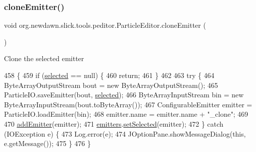 \subsubsection{\texorpdfstring{clone\+Emitter()}{cloneEmitter()}}
{\footnotesize\ttfamily void org.\+newdawn.\+slick.\+tools.\+peditor.\+Particle\+Editor.\+clone\+Emitter (\begin{DoxyParamCaption}{ }\end{DoxyParamCaption})\hspace{0.3cm}{\ttfamily [inline]}}

Clone the selected emitter 
\begin{DoxyCode}
458                                \{
459         \textcolor{keywordflow}{if} (\mbox{\hyperlink{classorg_1_1newdawn_1_1slick_1_1tools_1_1peditor_1_1_particle_editor_ac63e919aceff5c0b0c3b9a307b5f079a}{selected}} == null) \{
460             \textcolor{keywordflow}{return};
461         \}
462         
463         \textcolor{keywordflow}{try} \{
464             ByteArrayOutputStream bout = \textcolor{keyword}{new} ByteArrayOutputStream();
465             ParticleIO.saveEmitter(bout, \mbox{\hyperlink{classorg_1_1newdawn_1_1slick_1_1tools_1_1peditor_1_1_particle_editor_ac63e919aceff5c0b0c3b9a307b5f079a}{selected}});
466             ByteArrayInputStream bin = \textcolor{keyword}{new} ByteArrayInputStream(bout.toByteArray());
467             ConfigurableEmitter emitter = ParticleIO.loadEmitter(bin);
468             emitter.name = emitter.name + \textcolor{stringliteral}{"\_clone"};
469             
470             \mbox{\hyperlink{classorg_1_1newdawn_1_1slick_1_1tools_1_1peditor_1_1_particle_editor_a629e50ff72b6441ac93f15ae64073f2c}{addEmitter}}(emitter);
471             \mbox{\hyperlink{classorg_1_1newdawn_1_1slick_1_1tools_1_1peditor_1_1_particle_editor_adf3a8d24a0adf9e68e06a87f37ff378a}{emitters}}.\mbox{\hyperlink{classorg_1_1newdawn_1_1slick_1_1tools_1_1peditor_1_1_emitter_list_a2d4c1c8b76d20c25f3a7183ab5b4cd25}{setSelected}}(emitter);
472         \} \textcolor{keywordflow}{catch} (IOException e) \{
473             Log.error(e);
474             JOptionPane.showMessageDialog(\textcolor{keyword}{this}, e.getMessage());
475         \}
476     \}
\end{DoxyCode}
\mbox{\label{classorg_1_1newdawn_1_1slick_1_1tools_1_1peditor_1_1_particle_editor_a7f1ea102c18f468310a5fb4371759d71}} 
